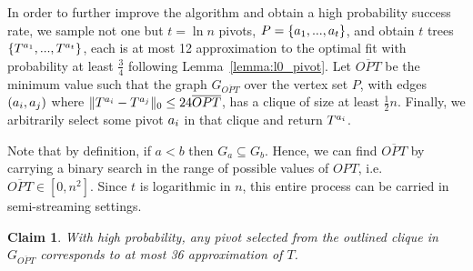 \documentclass{article}
\newtheorem{claim}[theorem]{Claim}
\begin{document}
In order to further improve the algorithm and obtain a high probability success rate, we sample not one but $t=\ln n$ pivots, $P=\{a_1,...,a_t \}$, and obtain $t$ trees $\{T^{a_1},...,T^{a_t}\}$, each is at most 12 approximation to the optimal fit with probability at least $\frac{3}{4}$ following Lemma~\ref{lemma:l0_pivot}. 
Let $\overline{OPT}$ be the minimum value such that the graph $G_{\overline{OPT}}$ over the vertex set $P$, with edges $(a_i,a_j)$ where $\lVert T^{a_i}-T^{a_j} \rVert_0 \leq 24\overline{OPT}$, has a clique of size at least $\frac{1}{2}n$. Finally, we arbitrarily select some pivot $a_i$ in that clique and return $T^{a_i}$.

Note that by definition, if $a<b$ then $G_a \subseteq G_b$. Hence, we can find $\overline{OPT}$ by carrying a binary search in the range of possible values of $OPT$, i.e. $\overline{OPT} \in [0,n^2]$. Since $t$ is logarithmic in $n$, this entire process can be carried in semi-streaming settings.

\begin{claim}
With high probability, any pivot selected from the outlined clique in $G_{\overline{OPT}}$ corresponds to at most 36 approximation of $T$.
\end{claim}
\end{document}
